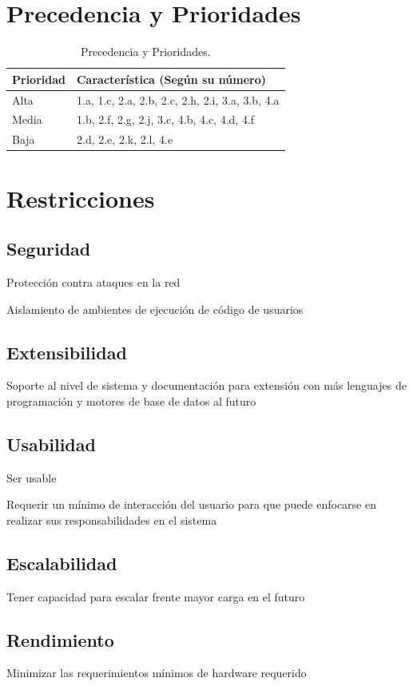 \pagebreak

\section{Precedencia y Prioridades}
\begin{table}[h!]
  \begin{tabular}{|p{}|p{}|}
    \hline
    \textbf{Prioridad} & \textbf{Característica (Según su número)} \\
    \hline
    Alta & 1.a, 1.c, 2.a, 2.b, 2.c, 2.h, 2.i, 3.a, 3.b, 4.a \\
    \hline
    Media & 1.b, 2.f, 2.g, 2.j, 3.c, 4.b, 4.c, 4.d, 4.f \\
    \hline
    Baja & 2.d, 2.e, 2.k, 2.l, 4.e \\
    \hline
  \end{tabular}
  \caption{Precedencia y Prioridades.}
  \label{precedencia-y-prioridades}
\end{table}

\section{Restricciones}
\subsection{Seguridad}
Protección contra ataques en la red

Aislamiento de ambientes de ejecución de código de usuarios
\subsection{Extensibilidad}
Soporte al nivel de sistema y documentación para extensión con más lenguajes de programación y motores de base de datos al futuro
\subsection{Usabilidad}
Ser usable

Requerir un mínimo de interacción del usuario para que puede enfocarse en realizar sus responsabilidades en el sistema
\subsection{Escalabilidad}
Tener capacidad para escalar frente mayor carga en el futuro
\subsection{Rendimiento}
Minimizar las requerimientos mínimos de hardware requerido
